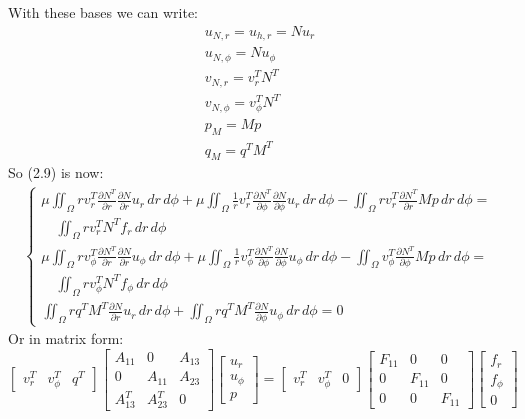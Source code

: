 \documentclass[12pt,a4paper]{report}
\begin{document}
With these bases we can write:
\begin{equation}
\begin{array}{l}
    u_{N,r} = u_{h,r}= Nu_r\\
    u_{N,\phi} = Nu_{\phi}\\
    v_{N,r} = v^T_r N^T\\
    v_{N,\phi} = v^T_{\phi} N^T\\
    p_M = Mp\\
    q_M = q^T M^T
\end{array}
\end{equation}
So (2.9) is now:
\begin{gather}
    \begin{cases}
        \mu \iint_{\Omega}rv^T_r \frac{\partial N^T}{\partial r}\frac{\partial N}{\partial r} u_r\, dr\,d\phi + \mu \iint_{\Omega} \frac{1}{r}v^T_r \frac{\partial N^T}{\partial \phi} \frac{\partial N}{\partial \phi} u_r\, dr\,d\phi - \iint_{\Omega} rv^T_r \frac{\partial N^T}{\partial r}Mp\, dr\,d\phi =\\
        \quad \iint_{\Omega} rv^T_rN^Tf_r \, dr\,d\phi\\
        \mu \iint_{\Omega}rv^T_{\phi} \frac{\partial N^T}{\partial r}\frac{\partial N}{\partial r} u_{\phi}\, dr\,d\phi + \mu \iint_{\Omega} \frac{1}{r}v^T_{\phi} \frac{\partial N^T}{\partial \phi} \frac{\partial N}{\partial \phi} u_{\phi}\, dr\,d\phi - \iint_{\Omega} v^T_{\phi} \frac{\partial N^T}{\partial \phi}Mp\, dr\,d\phi =\\
        \quad \iint_{\Omega} rv^T_{\phi}N^Tf_{\phi} \, dr\,d\phi\\
        \iint_{\Omega} rq^T M^T\frac{\partial N}{\partial r} u_r \,dr\,d\phi + \iint_{\Omega} rq^T M^T \frac{\partial N}{\partial \phi} u_{\phi} \,dr\,d\phi = 0
    \end{cases}
\end{gather}
Or in matrix form:\\
\begin{equation}
\begin{bmatrix}
v^T_r & v^T_{\phi} & q^T
\end{bmatrix}
\begin{bmatrix}
A_{11} & 0 & A_{13}\\
0 & A_{11} & A_{23}\\
A^T_{13} & A^T_{23} & 0
\end{bmatrix}
\begin{bmatrix}
u_r\\
u_{\phi}\\
p
\end{bmatrix}
=
\begin{bmatrix}
v^T_r & v^T_{\phi} & 0
\end{bmatrix}
\begin{bmatrix}
F_{11} & 0 & 0\\
0 & F_{11} & 0\\
0 & 0 & F_{11}
\end{bmatrix}
\begin{bmatrix}
f_r\\
f_{\phi}\\
0
\end{bmatrix}
\end{equation}\\
\end{document}

